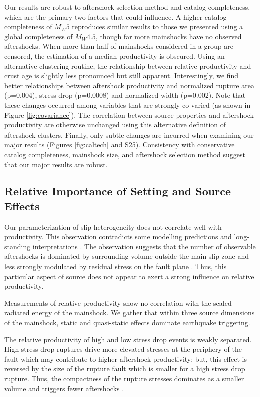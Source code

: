 \documentclass[draft, jgrga]{agujournal2018}
\begin{document}
Our results are robust to aftershock selection method and catalog completeness, which are the primary two factors that could influence. A higher catalog completeness of $M_W5$ reproduces similar results to those we presented using a global completeness of $M_W4.5$, though far more mainshocks have no observed aftershocks. When more than half of mainshocks considered in a group are censored, the estimation of a median productivity is obscured. Using an alternative clustering routine, the relationship between relative productivity and crust age is slightly less pronounced but still apparent. Interestingly, we find better relationships between aftershock productivity and normalized rupture area (p=0.004), stress drop (p=0.0008) and normalized width (p=0.002). Note that these changes occurred among variables that are strongly co-varied (as shown in Figure \ref{fig:covariance}). The correlation between source properties and aftershock productivity are otherwise unchanged using this alternative definition of aftershock clusters. Finally, only subtle changes are incurred when examining our major results (Figures \ref{fig:caltech} and S25). Consistency with conservative catalog completeness, mainshock size, and aftershock selection method suggest that our major results are robust.

\subsection{Relative Importance of Setting and Source Effects}

Our parameterization of slip heterogeneity does not correlate well with productivity. This observation contradicts some modelling predictions \citep{Helmstetter2006RelationModel, Marsan2006} and long-standing interpretations \citep{Mogi1967}. The observation suggests that the number of observable aftershocks is dominated by surrounding volume outside the main slip zone and less strongly modulated by residual stress on the fault plane \citep[as would be consistent with][]{Wetzler2018SystematicEarthquakes}. Thus, this particular aspect of source does not appear to exert a strong influence on relative productivity.

Measurements of relative productivity show no correlation with the scaled radiated energy of the mainshock. We gather that within three source dimensions of the mainshock, static and quasi-static effects dominate earthquake triggering.

The relative productivity of high and low stress drop events is weakly separated. High stress drop ruptures drive more elevated stresses at the periphery of the fault which may contribute to higher aftershock productivity; but, this effect is reversed by the size of the rupture fault which is smaller for a high stress drop rupture. Thus, the compactness of the rupture stresses dominates as a smaller volume and triggers fewer aftershocks \citep{Wetzler2016}.
\end{document}
